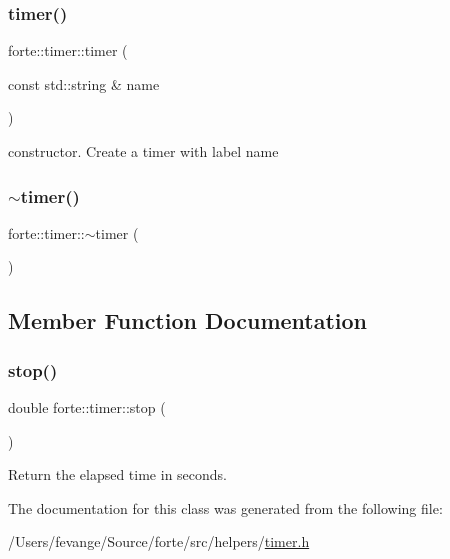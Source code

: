 \subsubsection{\texorpdfstring{timer()}{timer()}}
{\footnotesize\ttfamily forte\+::timer\+::timer (\begin{DoxyParamCaption}\item[{const std\+::string \&}]{name }\end{DoxyParamCaption})\hspace{0.3cm}{\ttfamily [inline]}}



constructor. Create a timer with label name 

\mbox{\label{classforte_1_1timer_ae831d007f3b77fe638efbb2abeaf8a3c}} 
\subsubsection{\texorpdfstring{$\sim$timer()}{~timer()}}
{\footnotesize\ttfamily forte\+::timer\+::$\sim$timer (\begin{DoxyParamCaption}{ }\end{DoxyParamCaption})\hspace{0.3cm}{\ttfamily [inline]}}



\subsection{Member Function Documentation}
\mbox{\label{classforte_1_1timer_a7e2811e5870d347a1604973d06e41554}} 
\subsubsection{\texorpdfstring{stop()}{stop()}}
{\footnotesize\ttfamily double forte\+::timer\+::stop (\begin{DoxyParamCaption}{ }\end{DoxyParamCaption})\hspace{0.3cm}{\ttfamily [inline]}}



Return the elapsed time in seconds. 



The documentation for this class was generated from the following file\+:\begin{DoxyCompactItemize}
\item 
/\+Users/fevange/\+Source/forte/src/helpers/\mbox{\hyperlink{timer_8h}{timer.\+h}}\end{DoxyCompactItemize}
